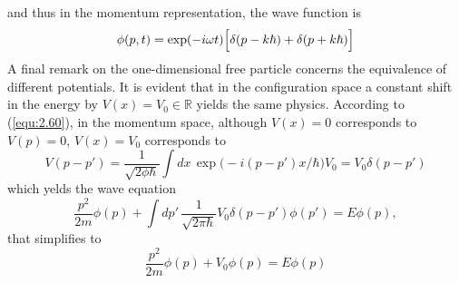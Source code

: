 and thus in the momentum representation, the wave function
is
\begin{equation}
  \phi(p,t) = \exp(-i\omega t) \Bigl[\delta(p - k\hbar) +
  \delta(p+k\hbar)\Bigr]
  \label{equ:2.145}
\end{equation}
A final remark on the one-dimensional free particle concerns
the equivalence of different potentials. It is evident that
in the configuration space a constant shift in the energy by
$V(x) = V_0 \in \mathbb{R}$ yields the same physics.
According to (\ref{equ:2.60}), in the momentum space,
although $V(x) = 0$ corresponds to $V(p) = 0$, $V(x) = V_0$
corresponds to
\begin{equation}
  V(p-p') = \frac{1}{\sqrt{2\phi\hbar}}
  \int dx\,
  \exp\bigl(-i(p-p')x/\hbar\bigr) V_0 = V_0 \delta(p-p')
  \label{equ:2.146}
\end{equation}
which yelds the wave equation
$$
\frac{p^2}{2m} \phi(p) + \int dp' \,
\frac{1}{\sqrt{2\pi\hbar}} V_0 \delta(p-p') \phi(p') =
E\phi(p),
$$
that simplifies to
\begin{equation}
  \frac{p^2}{2m} \phi(p) + V_0 \phi(p) = E\phi(p)
  \label{equ:2.147}
\end{equation}
